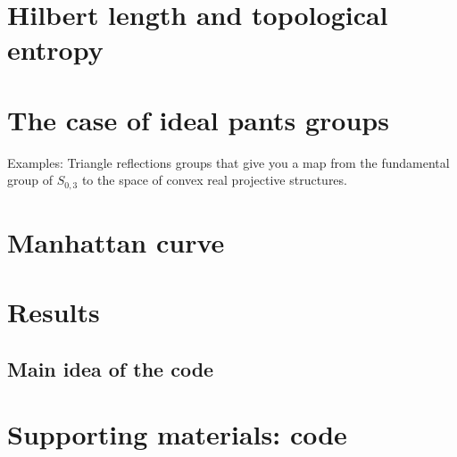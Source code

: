 \documentclass{amsart}
\begin{document}
\section{Hilbert length and topological entropy}
\section{The case of ideal pants groups}
Examples: Triangle reflections groups that give you a map from the fundamental group of $S_{0,3}$ to the space of convex real projective structures.
\section{Manhattan curve}
\section{Results}
\subsection{Main idea of the code}
\section{Supporting materials: code}


\printbibliography
\end{document}
